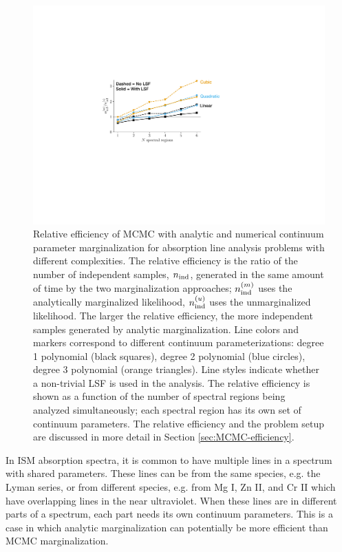 \documentclass[trackchanges]{aastex62}
\begin{document}
{\begin{figure}
  \includegraphics{efficiency.pdf}
  \caption{
  Relative efficiency of MCMC with analytic and numerical continuum parameter marginalization for absorption line analysis problems with different complexities.
  The relative efficiency is the ratio of the number of independent samples, $n_{\rm ind}$, generated in the same amount of time by the two marginalization approaches; $n_{\rm ind}^{(m)}$ uses the analytically marginalized likelihood, $n_{\rm ind}^{(u)}$ uses the unmarginalized likelihood.
  The larger the relative efficiency, the more independent samples generated by analytic marginalization.
  Line colors and markers correspond to different continuum parameterizations: degree 1 polynomial (black squares), degree 2 polynomial (blue circles), degree 3 polynomial (orange triangles).
  Line styles indicate whether a non-trivial LSF is used in the analysis.
  The relative efficiency is shown as a function of the number of spectral regions being analyzed simultaneously; each spectral region has its own set of continuum parameters.
  The relative efficiency and the problem setup are discussed in more detail in Section \ref{sec:MCMC-efficiency}.
  }
  \label{fig:efficiency-comparison}
\end{figure}

In ISM absorption spectra, it is common to have multiple lines in a spectrum with shared parameters.
These lines can be from the same species, e.g. the Lyman series, or from different species, e.g. from Mg {\tiny I}, Zn {\tiny II}, and Cr {\tiny II} which have overlapping lines in the near ultraviolet.
When these lines are in different parts of a spectrum, each part needs its own continuum parameters.
This is a case in which analytic marginalization can potentially be more efficient than MCMC marginalization.

}
\end{document}
